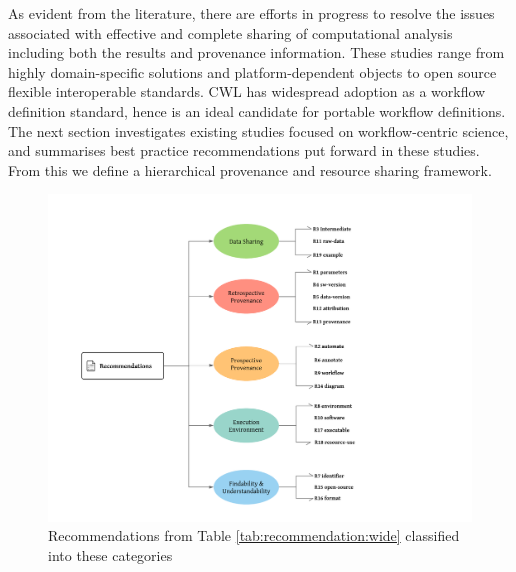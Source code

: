 \documentclass[a4paper,num-refs]{oup-contemporary}
\begin{document}
As evident from the literature, there are efforts in progress to resolve the issues associated with effective and complete sharing of computational analysis including both the results and provenance information. These studies range from highly domain-specific solutions and platform-dependent objects to open source flexible interoperable standards. CWL has widespread adoption as a workflow definition standard, hence is an ideal candidate for portable workflow definitions. The next section investigates existing studies focused on workflow-centric science, and summarises best practice recommendations put forward in these studies. From this we define a hierarchical provenance and resource sharing framework.
\begin{figure} [t!] 
\centering
\includegraphics[width=.9\textwidth]{images/recommendations2.png}
\captionsetup{justification=centering}
\caption{Recommendations from Table \ref{tab:recommendation:wide} classified into these categories} \label{fig:recommendationclasses}
\end{figure}
\end{document}

